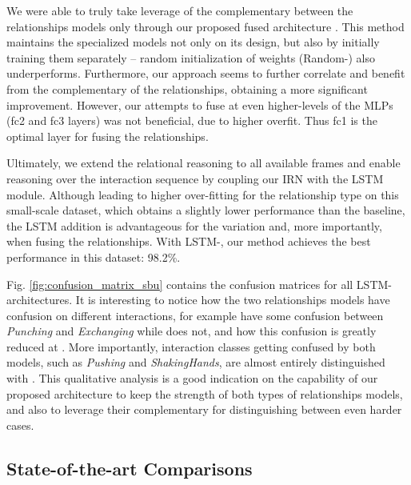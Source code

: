 \documentclass[journal,twoside]{IEEEtran}
\begin{document}
We were able to truly take leverage of the complementary between the relationships models only through our proposed fused architecture . This method maintains the specialized models not only on its design, but also by initially training them separately -- random initialization of weights (Random-) also underperforms.
Furthermore, our  approach seems to further correlate and benefit from the complementary of the relationships, obtaining a more significant improvement.
However, our attempts to fuse at even higher-levels of the MLPs (fc2 and fc3 layers) was not beneficial, due to higher overfit. Thus fc1 is the optimal layer for fusing the relationships.

Ultimately, we extend the relational reasoning to all available frames and enable reasoning over the interaction sequence by coupling our IRN with the LSTM module. 
Although leading to higher over-fitting for the  relationship type on this small-scale dataset, which obtains a slightly lower performance than the baseline, the LSTM addition is advantageous for the  variation and, more importantly, when fusing the relationships.
With LSTM-, our method achieves the best performance in this dataset: 98.2\%.

Fig. \ref{fig:confusion_matrix_sbu} contains the confusion matrices for all LSTM- architectures. 
It is interesting to notice how the two relationships models have confusion on different interactions, for example  have some confusion between \textit{Punching} and \textit{Exchanging} while  does not, and how this confusion is greatly reduced at .
More importantly, interaction classes getting confused by both models, such as \textit{Pushing} and \textit{ShakingHands}, are almost entirely distinguished with . 
This qualitative analysis is a good indication on the capability of our proposed architecture to keep the strength of both types of relationships models, and also to leverage their complementary for distinguishing between even harder cases.


\subsection{State-of-the-art Comparisons}
\end{document}
